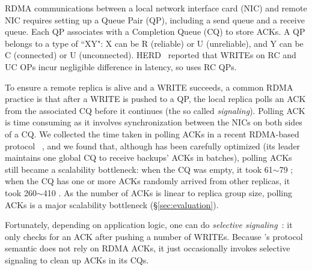 RDMA communications between a local network interface card (NIC) and remote NIC 
requires setting up a Queue Pair (QP), including a send queue and a receive 
queue. Each QP associates with a Completion Queue (CQ) to store ACKs. A QP 
belongs to a type of ``XY": X can be R (reliable) or U (unreliable), and Y can 
be C (connected) or U (unconnected). HERD~\cite{herd:sigcomm14} reported that 
WRITEs on RC and UC OPs incur negligible difference in latency, so \xxx uses RC 
QPs.




To ensure a remote replica is alive and a WRITE succeeds, a common RDMA 
practice is that after a WRITE is pushed to a QP, the local replica polls
an ACK from the associated CQ before it continues (the so 
called \emph{signaling}). Polling ACK is time consuming as it involves 
synchronization between the NICs on both sides of a CQ. We collected the time 
taken in polling ACKs in a recent RDMA-based \paxos protocol 
\dare~\cite{dare:hpdc15}, and we found that, although \dare has been 
carefully optimized (its leader maintains one global CQ to receive backups' ACKs 
in batches), polling ACKs still became a scalability bottleneck: when the CQ was 
empty, it took 61$\sim$79 \us; when the CQ has one or more ACKs randomly 
arrived from other replicas, it took 260$\sim$410 \us. As the number of ACKs is 
linear to replica group size, polling ACKs is a major scalability 
bottleneck (\S\ref{sec:evaluation}).


Fortunately, depending on application logic, one can do \emph{selective 
signaling}~\cite{herd:sigcomm14}: it only checks for an ACK after pushing a 
number of WRITEs. Because \xxx's protocol semantic does not rely on RDMA ACKs, 
it just occasionally invokes selective signaling to clean up ACKs in its CQs.


